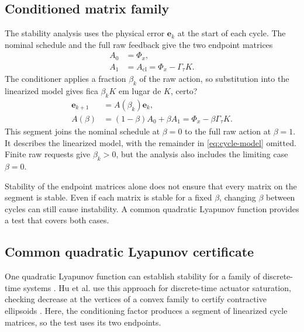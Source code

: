 \documentclass[pdflatex,iicol,sn-mathphys-ay]{sn-jnl}
\newcommand{\vect}[1]{\bm{#1}}
\newcommand{\red}[1]{{\color{red}#1}}
\begin{document}
\subsection{Conditioned matrix family}

The stability analysis uses the physical error $\vect{e}_k$ at the start of each cycle. The nominal schedule and the full raw feedback give the two endpoint matrices
\begin{equation}
\begin{aligned}
    A_0&=\Phi_x,\\
    A_1&=A_{\mathrm{cl}}=\Phi_x-\Gamma_\tau K.
\end{aligned}
    \label{eq:endpoints}
\end{equation}
The conditioner applies a fraction $\beta_k$ of the raw action, so substitution into the linearized model gives
\red{fica $\beta_k K$ em lugar de $K$, certo?}
\begin{equation}
\begin{aligned}
    \vect{e}_{k+1}&=A(\beta_k)\vect{e}_k,\\
    A(\beta)&=(1-\beta)A_0+\beta A_1
    =\Phi_x-\beta\Gamma_\tau K.
\end{aligned}
\label{eq:conditioned-family}
\end{equation}
This segment joins the nominal schedule at $\beta=0$ to the full raw action at $\beta=1$. It describes the linearized model, with the remainder in \eqref{eq:cycle-model} omitted. Finite raw requests give $\beta_k>0$, but the analysis also includes the limiting case $\beta=0$.

Stability of the endpoint matrices alone does not ensure that every matrix on the segment is stable. Even if each matrix is stable for a fixed $\beta$, changing $\beta$ between cycles can still cause instability. A common quadratic Lyapunov function provides a test that covers both cases.

\subsection{Common quadratic Lyapunov certificate}

One quadratic Lyapunov function can establish stability for a family of discrete-time systems \cite{mason2004commonQuadratic}. Hu et al. use this approach for discrete-time actuator saturation, checking decrease at the vertices of a convex family to certify contractive ellipsoids \cite{hu2002actuatorSaturation}. Here, the conditioning factor produces a segment of linearized cycle matrices, so the test uses its two endpoints.
\end{document}
